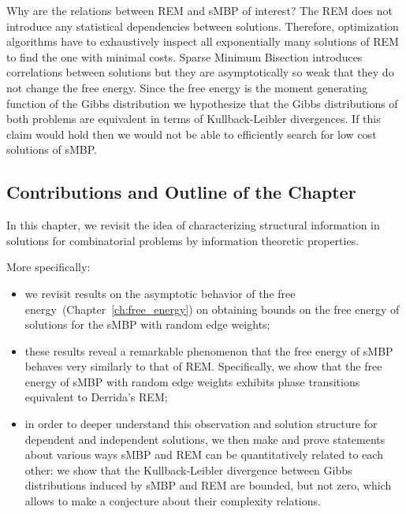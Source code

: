 
Why are the relations between REM and sMBP of interest?  The REM does not
introduce any statistical dependencies between solutions. Therefore,
optimization algorithms have to exhaustively inspect all exponentially many
solutions of REM to find the one with minimal costs. Sparse Minimum Bisection
introduces correlations between solutions but they are asymptotically so weak
that they do not change the free energy. Since the free energy is the moment
generating function of the Gibbs distribution we hypothesize that the Gibbs
distributions of both problems are equivalent in terms of Kullback-Leibler
divergences. If this claim would hold then we would not be able to efficiently
search for low cost solutions of sMBP.

\subsection{Contributions and Outline of the Chapter}
\label{sec:smbp_and_rem_contribs}

In this chapter, we revisit the idea of characterizing structural
information in solutions for combinatorial problems by 
information theoretic properties. 

More specifically:
%
\begin{itemize}
  \item we revisit results on the asymptotic behavior of the free
    energy~(Chapter~\ref{ch:free_energy}) on obtaining bounds on the free energy of
    solutions for the sMBP with random edge weights;

  \item these results reveal a remarkable phenomenon that the
    free energy of sMBP behaves very similarly to that of REM. Specifically, we
    show that the free energy of sMBP with random edge weights exhibits phase
    transitions equivalent to Derrida's REM;

  \item in order to deeper understand this observation and solution structure for
    dependent and independent solutions, we then make and prove statements about
    various ways sMBP and REM can be quantitatively related to each other: we show
    that the Kullback-Leibler divergence between Gibbs distributions induced by sMBP
    and REM are bounded, but not zero, which allows to make a conjecture about their
    complexity relations.
\end{itemize}

